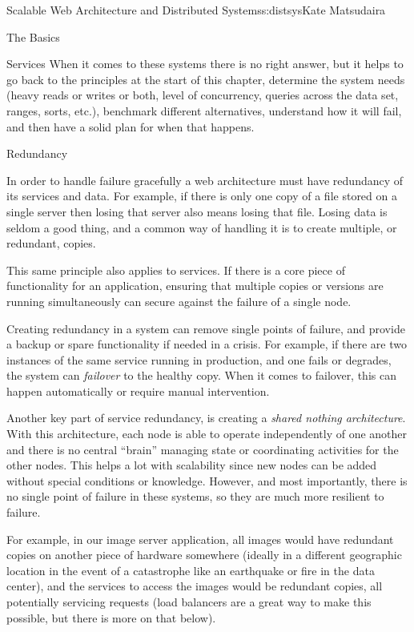 \begin{aosachapter}{Scalable Web Architecture and Distributed Systems}{s:distsys}{Kate Matsudaira}
\begin{aosasect1}{The Basics}
\begin{aosasect2}{Services}
When it comes to these systems there is no right answer, but it helps
to go back to the principles at the start of this chapter, determine
the system needs (heavy reads or writes or both, level of concurrency,
queries across the data set, ranges, sorts, etc.), benchmark different
alternatives, understand how it will fail, and then have a solid plan
for when that happens.

\end{aosasect2}

\begin{aosasect2}{Redundancy}

In order to handle failure gracefully a web architecture must have
redundancy of its services and data. For example, if there is only one
copy of a file stored on a single server then losing that server also
means losing that file. Losing data is seldom a good thing, and a
common way of handling it is to create multiple, or redundant, copies.

This same principle also applies to services. If there is a core piece
of functionality for an application, ensuring that multiple copies or
versions are running simultaneously can secure against the failure of
a single node.

Creating redundancy in a system can remove single points of failure,
and provide a backup or spare functionality if needed in a crisis. For
example, if there are two instances of the same service running in
production, and one fails or degrades, the system can \emph{failover}
to the healthy copy. When it comes to failover, this can happen
automatically or require manual intervention.

Another key part of service redundancy, is creating a \emph{shared
  nothing architecture}. With this architecture, each node is able to
operate independently of one another and there is no central ``brain''
managing state or coordinating activities for the other nodes. This
helps a lot with scalability since new nodes can be added without
special conditions or knowledge. However, and most importantly, there
is no single point of failure in these systems, so they are much more
resilient to failure.

For example, in our image server application, all images would have
redundant copies on another piece of hardware somewhere (ideally in a
different geographic location in the event of a catastrophe like an
earthquake or fire in the data center), and the services to access the
images would be redundant copies, all potentially servicing requests
(load balancers are a great way to make this possible, but there is
more on that below).


\end{aosasect2}
\end{aosasect1}
\end{aosachapter}
